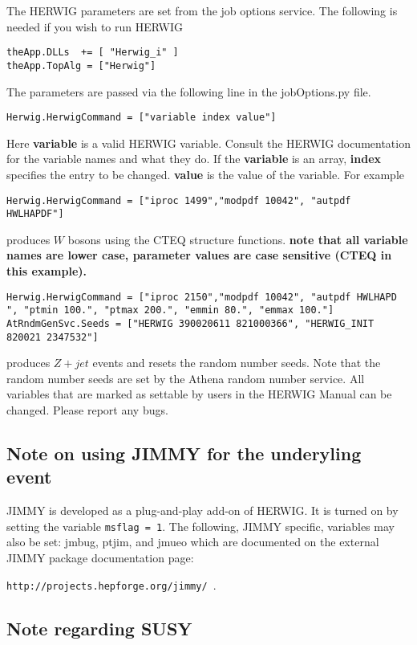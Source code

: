 \documentclass[11pt]{article}
\begin{document}
The HERWIG parameters are set from the job options service. 
The following is needed if you wish to run HERWIG
\begin{verbatim}
theApp.DLLs  += [ "Herwig_i" ]  
theApp.TopAlg = ["Herwig"]
\end{verbatim}
The parameters are passed via the following line in the jobOptions.py
file.
\begin{verbatim}
Herwig.HerwigCommand = ["variable index value"]
\end{verbatim} 
Here {\bf variable} is a valid HERWIG variable. Consult the HERWIG
documentation for the variable names and what they do. If the {\bf
  variable} is an array, {\bf index} specifies the entry to be
changed. {\bf value} is the value of the variable.  For example
\begin{verbatim}
Herwig.HerwigCommand = ["iproc 1499","modpdf 10042", "autpdf HWLHAPDF"]
\end{verbatim} 
produces $W$ bosons using the CTEQ structure functions. {\bf note that
all variable names are lower case, parameter values are case sensitive
(CTEQ in this example).}
\begin{verbatim}
Herwig.HerwigCommand = ["iproc 2150","modpdf 10042", "autpdf HWLHAPD
", "ptmin 100.", "ptmax 200.", "emmin 80.", "emmax 100."]   
AtRndmGenSvc.Seeds = ["HERWIG 390020611 821000366", "HERWIG_INIT
820021 2347532"]
\end{verbatim}
produces $Z+jet$ events and resets the random number seeds. Note that
the random number seeds are set by the Athena random number service.
All variables that are marked as settable by users in the HERWIG
Manual can be changed. Please report any bugs.

\medskip

\subsection*{Note on using JIMMY for the underyling event}

\noindent
JIMMY is developed as a plug-and-play add-on of HERWIG. It is turned
on by setting the variable {\tt msflag = 1}. The following, JIMMY
specific, variables may also be set: jmbug, ptjim, and jmueo which are
documented on the external JIMMY package documentation page:

{\tt http://projects.hepforge.org/jimmy/ }.

\subsection*{Note regarding SUSY}
\end{document}
